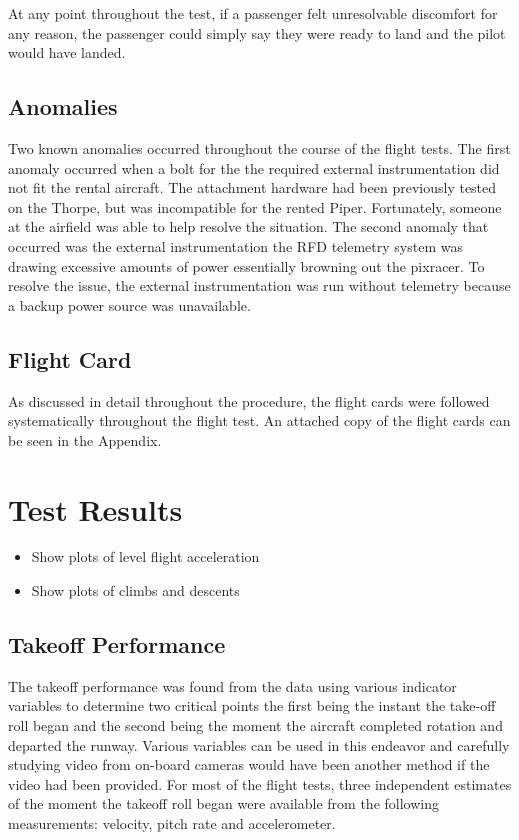 \documentclass[conf]{new-aiaa}
\begin{document}
At any point throughout the test, if a passenger felt unresolvable discomfort for any reason, the passenger could simply say they were ready to land and the pilot would have landed. 

\subsection{Anomalies}

Two known anomalies occurred throughout the course of the flight tests. The first anomaly occurred when a bolt for the the required external instrumentation did not fit the rental aircraft. The attachment hardware had been previously tested on the Thorpe, but was incompatible for the rented Piper. Fortunately, someone at the airfield was able to help resolve the situation. The second anomaly that occurred was the  external instrumentation the RFD telemetry system was drawing excessive amounts of power essentially browning out the pixracer. To resolve the issue, the external instrumentation was run without telemetry because a backup power source was unavailable.   
\subsection{Flight Card}

As discussed in detail throughout the procedure, the flight cards were followed systematically throughout the flight test. An attached copy of the flight cards can be seen in the Appendix. 

\section{Test Results}

\begin{itemize}
	\item Show plots of level flight acceleration
	\item Show plots of climbs and descents
\end{itemize}

\subsection{Takeoff Performance}

The takeoff performance was found from the data using various indicator variables to determine two critical points the first being the instant the take-off roll began and the second being the moment the aircraft completed rotation and departed the runway. Various variables can be used in this endeavor and carefully studying video from on-board cameras would have been another method if the video had been provided. For most of the flight tests, three independent estimates of the moment the takeoff roll began were available from the following measurements: velocity, pitch rate and accelerometer.
\end{document}
